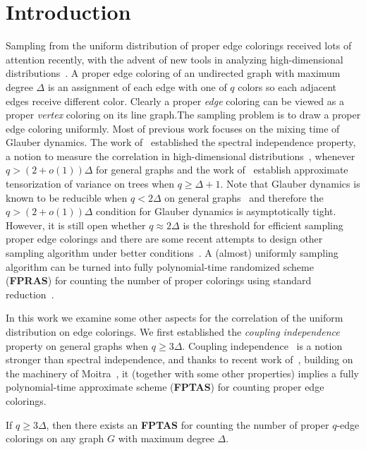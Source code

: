 
\section{Introduction}

Sampling from the uniform distribution of proper edge colorings received lots of attention recently, with the advent of new tools in analyzing high-dimensional distributions~\cite{DHP20,ALOG21,WZZ24,CCFV25}. A proper edge coloring of an undirected graph with maximum degree $\Delta$ is an assignment of each edge with one of $q$ colors so each adjacent edges receive different color. Clearly a proper \emph{edge} coloring can be viewed as a proper \emph{vertex} coloring on its line graph.The sampling problem is to draw a proper edge coloring uniformly. Most of previous work focuses on the mixing time of Glauber dynamics. The work of~\cite{WZZ24} established the spectral independence property, a notion to measure the correlation in high-dimensional distributions~\cite{ALO21}, whenever $q>(2+o(1))\Delta$ for general graphs and the work of~\cite{CCFV25} establish approximate tensorization of variance on trees when $q\ge \Delta+1$. Note that Glauber dynamics is known to be reducible when $q<2\Delta$ on general graphs~\cite{MJNP19} and therefore the $q>(2+o(1))\Delta$ condition for Glauber dynamics is asymptotically tight. However, it is still open whether $q\approx 2\Delta$ is the threshold for efficient sampling proper edge colorings and there are some recent attempts to design other sampling algorithm under better conditions~\cite{DKLP25}. A (almost) uniformly sampling algorithm can be turned into fully polynomial-time randomized scheme (\textbf{FPRAS}) for counting the number of proper colorings using standard reduction~\cite{JVV86}. 

In this work we examine some other aspects for the correlation of the uniform distribution on edge colorings. We first established the \emph{coupling independence} property on general graphs when $q\ge 3 \Delta$. Coupling independence~\cite{CZ23} is a notion stronger than spectral independence, and thanks to recent work of~\cite{CFGZZ24}, building on the machinery of Moitra~\cite{Moitra19}, it (together with some other properties) implies a fully polynomial-time approximate scheme (\textbf{FPTAS}) for counting proper edge colorings. 
\begin{theorem}[Informal] \label{thm:FPTAS-informal}
    If $q\geq 3\Delta$, then there exists an \textbf{FPTAS} for counting the number of proper $q$-edge colorings on any graph $G$ with maximum degree $\Delta$.
\end{theorem}

